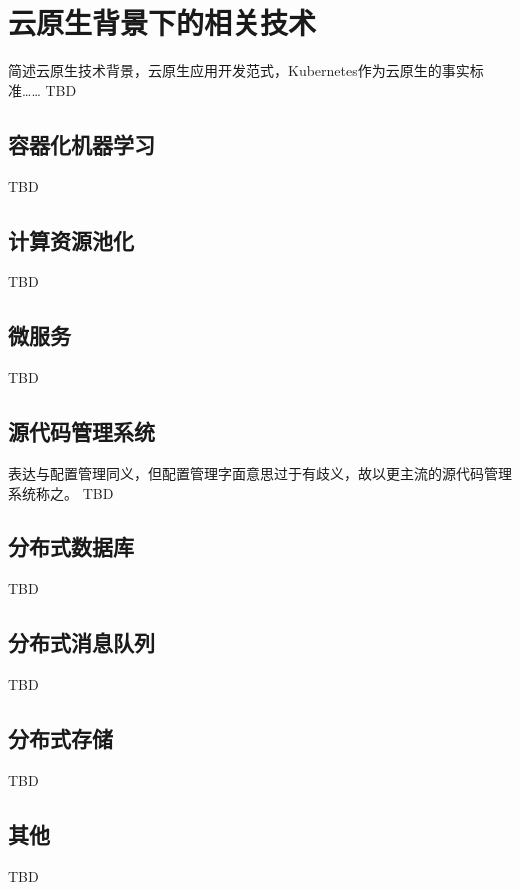 
\chapter{云原生背景下的相关技术}

简述云原生技术背景，云原生应用开发范式，Kubernetes作为云原生的事实标准……
TBD


\section{容器化机器学习}

TBD


\section{计算资源池化}

TBD


\section{微服务}

TBD


\section{源代码管理系统}

表达与配置管理同义，但配置管理字面意思过于有歧义，故以更主流的源代码管理系统称之。
TBD


\section{分布式数据库}

TBD


\section{分布式消息队列}

TBD


\section{分布式存储}

TBD


\section{其他}

TBD
